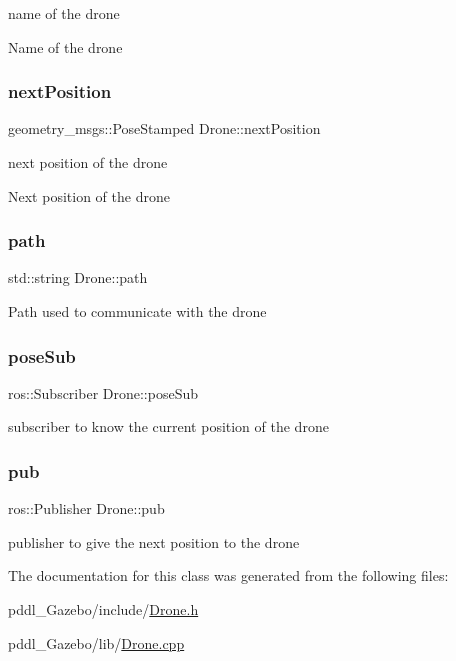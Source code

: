 name of the drone

Name of the drone \mbox{\label{classDrone_a49f95c0480f27c22c122f5bb8482e914}} 
\subsubsection{\texorpdfstring{next\+Position}{nextPosition}}
{\footnotesize\ttfamily geometry\+\_\+msgs\+::\+Pose\+Stamped Drone\+::next\+Position\hspace{0.3cm}{\ttfamily [protected]}}

next position of the drone

Next position of the drone \mbox{\label{classDrone_a19bf0a73d086997ba0589984c58b62da}} 
\subsubsection{\texorpdfstring{path}{path}}
{\footnotesize\ttfamily std\+::string Drone\+::path\hspace{0.3cm}{\ttfamily [protected]}}

Path used to communicate with the drone \mbox{\label{classDrone_a8baae58c4cbe6f1a8d239fca2d3496d6}} 
\subsubsection{\texorpdfstring{pose\+Sub}{poseSub}}
{\footnotesize\ttfamily ros\+::\+Subscriber Drone\+::pose\+Sub\hspace{0.3cm}{\ttfamily [protected]}}

subscriber to know the current position of the drone \mbox{\label{classDrone_a4bdfc664da2ebff40d9a4b413e4ea768}} 
\subsubsection{\texorpdfstring{pub}{pub}}
{\footnotesize\ttfamily ros\+::\+Publisher Drone\+::pub\hspace{0.3cm}{\ttfamily [protected]}}

publisher to give the next position to the drone 

The documentation for this class was generated from the following files\+:\begin{DoxyCompactItemize}
\item 
pddl\+\_\+\+Gazebo/include/\hyperlink{pddl__Gazebo_2include_2Drone_8h}{Drone.\+h}\item 
pddl\+\_\+\+Gazebo/lib/\hyperlink{pddl__Gazebo_2lib_2Drone_8cpp}{Drone.\+cpp}\end{DoxyCompactItemize}
